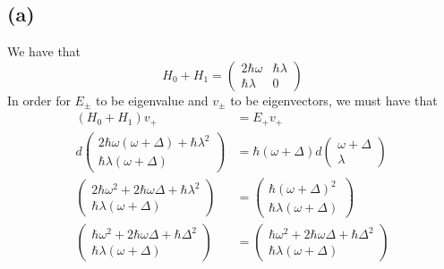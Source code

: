 \documentclass[11pt]{article}
\begin{document}
\subsection*{(a)}
We have that 
$$H_0+H_1 = \begin{pmatrix}
    2\hbar\omega & \hbar\lambda\\
    \hbar\lambda & 0
\end{pmatrix}$$
In order for $E_{\pm}$ to be eigenvalue and $v_{\pm}$ to be 
eigenvectors, we must have that
\begin{align*}
    (H_0+H_1)v_{+} &= E_{+}v_{+}\\
    d \begin{pmatrix}
        2\hbar\omega(\omega+\Delta)+\hbar\lambda^2\\
        \hbar\lambda(\omega+\Delta)
    \end{pmatrix} &= \hbar(\omega+\Delta)d\begin{pmatrix}
        \omega+\Delta\\
        \lambda
    \end{pmatrix}\\
    \begin{pmatrix}
        2\hbar\omega^2+2\hbar\omega\Delta+\hbar\lambda^2\\
        \hbar\lambda(\omega+\Delta)
    \end{pmatrix} &= \begin{pmatrix}
        \hbar(\omega+\Delta)^2\\
        \hbar\lambda(\omega+\Delta)
    \end{pmatrix}\\
    \begin{pmatrix}
        \hbar\omega^2+2\hbar\omega\Delta+\hbar\Delta^2\\
        \hbar\lambda(\omega+\Delta)
    \end{pmatrix} &= \begin{pmatrix}
        \hbar\omega^2+2\hbar\omega\Delta+\hbar\Delta^2\\
        \hbar\lambda(\omega+\Delta)
    \end{pmatrix}
\end{align*}
\end{document}
